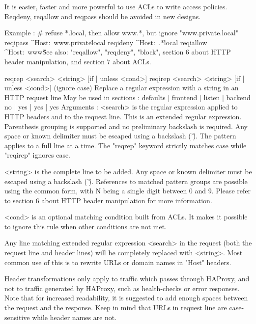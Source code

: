   It is easier, faster and more powerful to use ACLs to write access policies.
  Reqdeny, reqallow and reqpass should be avoided in new designs.

  Example :
     # refuse *.local, then allow www.*, but ignore "www.private.local"
     reqipass  ^Host:\ www.private\.local
     reqideny  ^Host:\ .*\.local
     reqiallow ^Host:\ www\.

  See also: "reqallow", "reqdeny", "block", section 6 about HTTP header
            manipulation, and section 7 about ACLs.


reqrep  <search> <string> [{if | unless} <cond>]
reqirep <search> <string> [{if | unless} <cond>]   (ignore case)
  Replace a regular expression with a string in an HTTP request line
  May be used in sections :   defaults | frontend | listen | backend
                                 no    |    yes   |   yes  |   yes
  Arguments :
    <search>  is the regular expression applied to HTTP headers and to the
              request line. This is an extended regular expression. Parenthesis
              grouping is supported and no preliminary backslash is required.
              Any space or known delimiter must be escaped using a backslash
              ('\'). The pattern applies to a full line at a time. The "reqrep"
              keyword strictly matches case while "reqirep" ignores case.

    <string>  is the complete line to be added. Any space or known delimiter
              must be escaped using a backslash ('\'). References to matched
              pattern groups are possible using the common \N form, with N
              being a single digit between 0 and 9. Please refer to section
              6 about HTTP header manipulation for more information.

    <cond>    is an optional matching condition built from ACLs. It makes it
              possible to ignore this rule when other conditions are not met.

  Any line matching extended regular expression <search> in the request (both
  the request line and header lines) will be completely replaced with <string>.
  Most common use of this is to rewrite URLs or domain names in "Host" headers.

  Header transformations only apply to traffic which passes through HAProxy,
  and not to traffic generated by HAProxy, such as health-checks or error
  responses. Note that for increased readability, it is suggested to add enough
  spaces between the request and the response. Keep in mind that URLs in
  request line are case-sensitive while header names are not.

